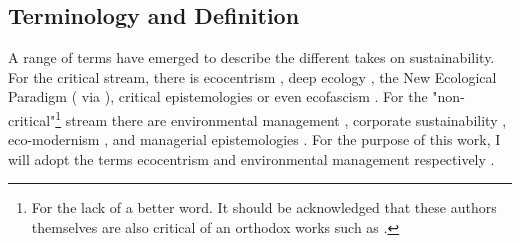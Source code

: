 \subsection*{Terminology and Definition}

A range of terms have emerged to describe the different takes on sustainability. For the critical stream, there is ecocentrism \citep{Purser1995}, deep ecology \citep{Newton2002}, the New Ecological Paradigm (\citealp{Catton1980} via \citealp{Hoffman2015}), critical epistemologies \citep{Ergene2020} or even ecofascism \citep{Newton2002}. For the "non-critical"\footnote{For the lack of a better word. It should be acknowledged that these authors themselves are also critical of an orthodox works such as \citet{Friedman1962}.} stream there are environmental management \citep{Purser1995}, corporate sustainability \citep{Hahn2014}, eco-modernism \citep{Springett2003}, and managerial epistemologies \citep{Ergene2020}. For the purpose of this work, I will adopt the terms ecocentrism and environmental management respectively \citep{Purser1995}.



